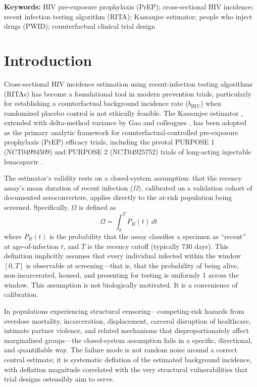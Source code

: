 \documentclass[12pt]{article}
\begin{document}
\noindent\textbf{Keywords:} HIV pre-exposure prophylaxis (PrEP); cross-sectional HIV incidence; recent infection testing algorithm (RITA); Kassanjee estimator; people who inject drugs (PWID); counterfactual clinical trial design
\newpage


\section{Introduction}

Cross-sectional HIV incidence estimation using recent-infection testing algorithms (RITAs) has become a foundational tool in modern prevention trials, particularly for establishing a counterfactual background incidence rate ($b_{\mathrm{HIV}}$) when randomized placebo control is not ethically feasible. The Kassanjee estimator \cite{kassanjee2012}, extended with delta-method variance by Gao and colleagues \cite{gao2021}, has been adopted as the primary analytic framework for counterfactual-controlled pre-exposure prophylaxis (PrEP) efficacy trials, including the pivotal PURPOSE 1 (NCT04994509) and PURPOSE 2 (NCT04925752) trials of long-acting injectable lenacapavir \cite{bekker2024,kelley2025}.

The estimator's validity rests on a closed-system assumption: that the recency assay's mean duration of recent infection ($\Omega$), calibrated on a validation cohort of documented seroconverters, applies directly to the at-risk population being screened. Specifically, $\Omega$ is defined as
\begin{equation}
\Omega = \int_0^T P_R(t)\, dt
\end{equation}
where $P_R(t)$ is the probability that the assay classifies a specimen as ``recent'' at age-of-infection $t$, and $T$ is the recency cutoff (typically 730 days). This definition implicitly assumes that every individual infected within the window $[0, T]$ is observable at screening---that is, that the probability of being alive, non-incarcerated, housed, and presenting for testing is uniformly 1 across the window. This assumption is not biologically motivated. It is a convenience of calibration.

In populations experiencing structural censoring---competing-risk hazards from overdose mortality, incarceration, displacement, carceral disruption of healthcare, intimate partner violence, and related mechanisms that disproportionately affect marginalized groups---the closed-system assumption fails in a specific, directional, and quantifiable way. The failure mode is not random noise around a correct central estimate; it is systematic deflation of the estimated background incidence, with deflation magnitude correlated with the very structural vulnerabilities that trial designs ostensibly aim to serve.
\end{document}
